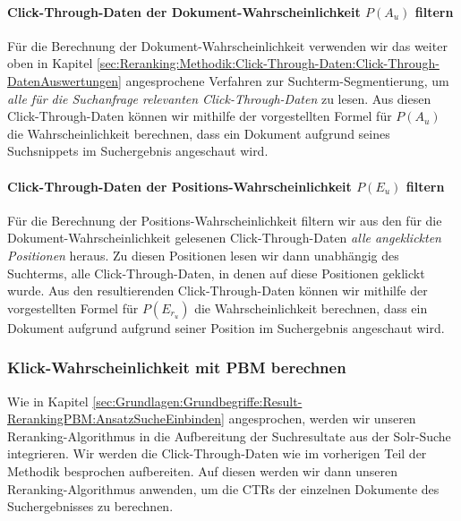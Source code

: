 \paragraph{Click-Through-Daten der Dokument-Wahrscheinlichkeit $P(A_{u})$ filtern}
Für die Berechnung der Dokument-Wahrscheinlichkeit verwenden wir das weiter oben in Kapitel \ref{sec:Reranking:Methodik:Click-Through-Daten:Click-Through-DatenAuswertungen} angesprochene Verfahren zur Suchterm-Segmentierung, um \textit{alle für die Suchanfrage relevanten Click-Through-Daten} zu lesen. Aus diesen Click-Through-Daten können wir mithilfe der vorgestellten Formel für $P(A_{u})$ die Wahrscheinlichkeit berechnen, dass ein Dokument aufgrund seines Suchsnippets im Suchergebnis angeschaut wird.  

\paragraph{Click-Through-Daten der Positions-Wahrscheinlichkeit $P(E_{u})$ filtern}
Für die Berechnung der Positions-Wahrscheinlichkeit filtern wir aus den für die Dokument-Wahrscheinlichkeit
gelesenen Click-Through-Daten \textit{alle angeklickten Positionen} heraus. Zu diesen Positionen lesen wir dann unabhängig des Suchterms, alle Click-Through-Daten, in denen auf diese Positionen geklickt wurde. Aus den resultierenden Click-Through-Daten können wir mithilfe der vorgestellten Formel für $P(E_{r_{u}})$ die Wahrscheinlichkeit berechnen, dass ein Dokument aufgrund aufgrund seiner Position im Suchergebnis angeschaut wird.

\subsubsection{Klick-Wahrscheinlichkeit mit PBM berechnen}
\label{sec:Reranking:Methodik:Result-RerankingPBM:Klick-Wahrscheinlichkeit}

Wie in Kapitel \ref{sec:Grundlagen:Grundbegriffe:Result-RerankingPBM:AnsatzSucheEinbinden} angesprochen, werden wir unseren Reranking-Algorithmus in die Aufbereitung der Suchresultate aus der Solr-Suche integrieren. Wir werden die Click-Through-Daten wie im vorherigen Teil der Methodik besprochen aufbereiten. Auf diesen werden wir dann unseren Reranking-Algorithmus anwenden, um die CTRs der einzelnen Dokumente des Suchergebnisses zu berechnen. 

